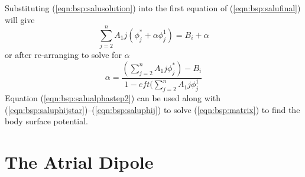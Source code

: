 Substituting (\ref{eqn:bsp:salusolution}) into the first equation of
(\ref{eqn:bsp:salufinal}) will give
\begin{equation}
\label{eqn:bsp:salualphastep1}
\sum_{j=2}^n A_1j \left(\phi_j^* + \alpha\phi_j^1\right) = B_i + \alpha
\end{equation}
or after re-arranging to solve for $\alpha$
\begin{equation}
\label{eqn:bsp:salualphastep2}
\alpha = 
    \frac{
        \left(\sum_{j=2}^n A_1j \phi_j^*\right)-B_i
        }{
        1-eft(\sum_{j=2}^n A_1j \phi_j^1
        }
\end{equation}
Equation (\ref{eqn:bsp:salualphastep2}) can be used along with
(\ref{eqn:bsp:saluphijstar})--(\ref{eqn:bsp:saluphij}) to solve
(\ref{eqn:bsp:matrix}) to find the body surface potential.

\section{The Atrial Dipole}

